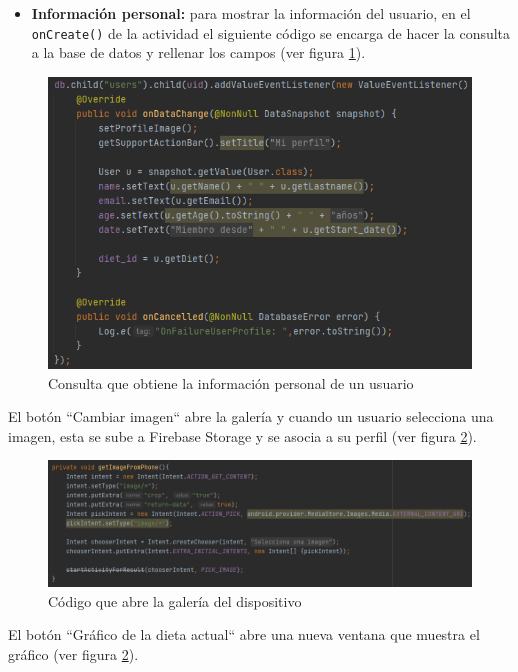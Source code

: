 \begin{itemize}
    \item \textbf{Información personal:} para mostrar la información del usuario, en el \texttt{onCreate()} de la actividad el siguiente código se encarga de hacer la consulta a la base de datos y rellenar los campos (ver figura \ref{fig:consulta}).
\end{itemize}
\begin{figure}[H]
    \centering
    \includegraphics[width=\textwidth]{Images/Capitulo7/consulta.png}
    \caption{Consulta que obtiene la información personal de un usuario}
    \label{fig:consulta}
\end{figure}

El botón ``Cambiar imagen`` abre la galería y cuando un usuario selecciona una imagen, esta se sube a Firebase Storage y se asocia a su perfil (ver figura \ref{fig:getimagephtone}).
\begin{figure}[H]
    \centering
    \includegraphics[width=\textwidth]{Images/Capitulo7/getimagephtone.png}
    \caption{Código que abre la galería del dispositivo}
    \label{fig:getimagephtone}
\end{figure}

El botón ``Gráfico de la dieta actual`` abre una nueva ventana que muestra el gráfico (ver figura \ref{fig:getimagephtone}).

